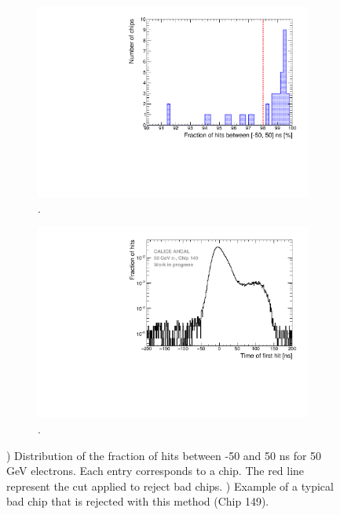 \begin{figure}[htbp!]
	\begin{subfigure}[t]{0.5\textwidth}
		\centering
		\includegraphics[width=1\linewidth]{../Thesis_Plots/Timing/Electrons/Plots/FractionRejectedChips.pdf}
		\caption{.} \label{fig:FracRejChip}
	\end{subfigure}
	\hfill
	\begin{subfigure}[t]{0.5\textwidth}
		\centering
		\includegraphics[width=1\linewidth]{../Thesis_Plots/Timing/Electrons/Plots/ExampleBadChip149.pdf}
		\caption{.} \label{fig:ExBadChip}
	\end{subfigure}
	\caption{) Distribution of the fraction of hits between -50 and 50 ns for 50 GeV electrons. Each entry corresponds to a chip. The red line represent the cut applied to reject bad chips. ) Example of a typical bad chip that is rejected with this method (Chip 149).}
\end{figure}

